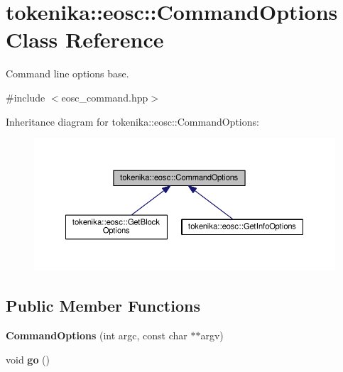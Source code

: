 \hypertarget{classtokenika_1_1eosc_1_1_command_options}{}\section{tokenika\+:\+:eosc\+:\+:Command\+Options Class Reference}
\label{classtokenika_1_1eosc_1_1_command_options}


Command line options base.  




{\ttfamily \#include $<$eosc\+\_\+command.\+hpp$>$}



Inheritance diagram for tokenika\+:\+:eosc\+:\+:Command\+Options\+:\nopagebreak
\begin{figure}[H]
\begin{center}
\leavevmode
\includegraphics[width=350pt]{classtokenika_1_1eosc_1_1_command_options__inherit__graph}
\end{center}
\end{figure}
\subsection*{Public Member Functions}
\begin{DoxyCompactItemize}
\item 
\mbox{\label{classtokenika_1_1eosc_1_1_command_options_a263a61f90aa324090e2d9d592b2d4ad6}} 
{\bfseries Command\+Options} (int argc, const char $\ast$$\ast$argv)
\item 
\mbox{\label{classtokenika_1_1eosc_1_1_command_options_a4fa1c9defc45b139e415c79c43b15e5d}} 
void {\bfseries go} ()
\end{DoxyCompactItemize}
